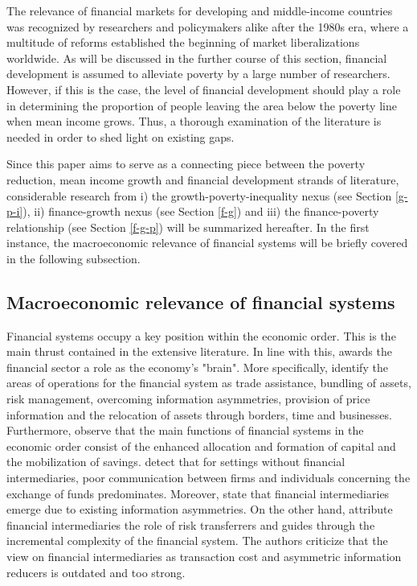 \documentclass[12pt, a4paper]{article}
\begin{document}
The relevance of financial markets for developing and middle-income countries was recognized by researchers and policymakers alike after the 1980s era, where a multitude of reforms established the beginning of market liberalizations worldwide. As will be discussed in the further course of this section, financial development is assumed to alleviate poverty by a large number of researchers. However, if this is the case, the level of financial development should play a role in determining the proportion of people leaving the area below the poverty line when mean income grows. Thus, a thorough examination of the literature is needed in order to shed light on existing gaps.

Since this paper aims to serve as a connecting piece between the poverty reduction, mean income growth and financial development strands of literature, considerable research from i) the growth-poverty-inequality nexus (see Section \ref{g-p-i}), ii) finance-growth nexus (see Section \ref{f-g}) and iii) the finance-poverty relationship (see Section \ref{f-g-p}) will be summarized hereafter. In the first instance, the macroeconomic relevance of financial systems will be briefly covered in the following subsection.

\subsection{Macroeconomic relevance of financial systems} 

Financial systems occupy a key position within the economic order. This is the main thrust contained in the extensive literature. In line with this,  awards the financial sector a role as the economy's "brain". More specifically,  identify the areas of operations for the financial system as trade assistance, bundling of assets, risk management, overcoming information asymmetries, provision of price information and the relocation of assets through borders, time and businesses. Furthermore,  observe that the main functions of financial systems in the economic order consist of the enhanced allocation and formation of capital and the mobilization of savings.  detect that for settings without financial intermediaries, poor communication between firms and individuals concerning the exchange of funds predominates. Moreover,  state that financial intermediaries emerge due to existing information asymmetries. On the other hand,  attribute financial intermediaries the role of risk transferrers and guides through the incremental complexity of the financial system. The authors criticize that the view on financial intermediaries as transaction cost and asymmetric information reducers is outdated and too strong.
\end{document}
